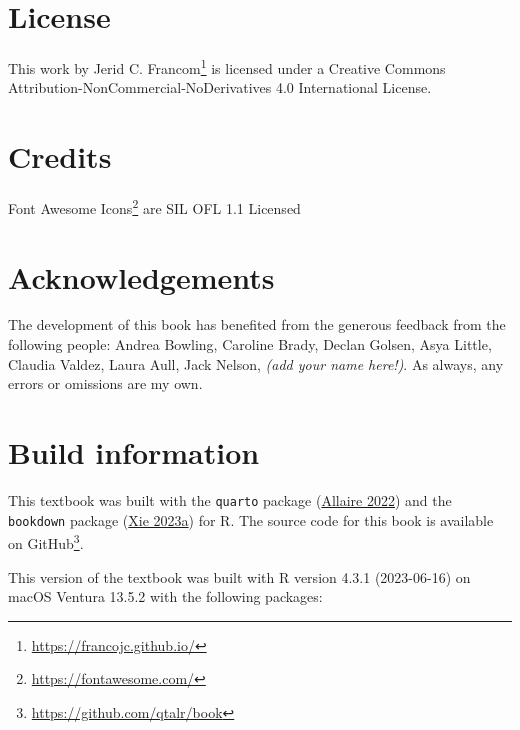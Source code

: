 \documentclass[
  letterpaper,
  DIV=11,
  numbers=noendperiod]{scrreport}
\theoremstyle{definition}
\theoremstyle{remark}
\DeclareRobustCommand{\href}[2]{#2\footnote{\url{#1}}}
\begin{document}
\hypertarget{license}{%
\section*{License}\label{license}}


This work by \href{https://francojc.github.io/}{Jerid C. Francom} is
licensed under a Creative Commons
Attribution-NonCommercial-NoDerivatives 4.0 International License.

\hypertarget{credits}{%
\section*{Credits}\label{credits}}


\href{https://fontawesome.com/}{Font Awesome Icons} are SIL OFL 1.1
Licensed

\hypertarget{acknowledgements}{%
\section*{Acknowledgements}\label{acknowledgements}}


The development of this book has benefited from the generous feedback
from the following people: Andrea Bowling, Caroline Brady, Declan
Golsen, Asya Little, Claudia Valdez, Laura Aull, Jack Nelson, \emph{(add
your name here!)}. As always, any errors or omissions are my own.

\hypertarget{build-information}{%
\section*{Build information}\label{build-information}}


This textbook was built with the \texttt{quarto} package
(\protect\hyperlink{ref-R-quarto}{Allaire 2022}) and the
\texttt{bookdown} package (\protect\hyperlink{ref-R-bookdown}{Xie
2023a}) for R. The source code for this book is available on
\href{https://github.com/qtalr/book}{GitHub}.

This version of the textbook was built with R version 4.3.1 (2023-06-16)
on macOS Ventura 13.5.2 with the following packages:
\end{document}
